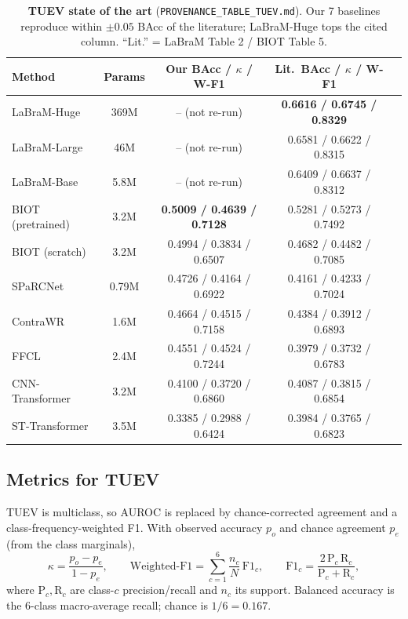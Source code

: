 \documentclass[10pt,a4paper]{article}
\newcommand{\best}[1]{\textbf{#1}}
\begin{document}
\begin{table}[h]\centering\small
\setlength{\tabcolsep}{6pt}\renewcommand{\arraystretch}{1.15}
\begin{tabular}{@{}lcccc@{}}
\toprule
\textbf{Method} & \textbf{Params} & \textbf{Our BAcc / $\kappa$ / W-F1} & \textbf{Lit.\ BAcc / $\kappa$ / W-F1} \\
\midrule
LaBraM-Huge \cite{labram}  & 369M & -- (not re-run) & \best{0.6616 / 0.6745 / 0.8329} \\
LaBraM-Large \cite{labram} & 46M  & -- (not re-run) & 0.6581 / 0.6622 / 0.8315 \\
LaBraM-Base \cite{labram}  & 5.8M & -- (not re-run) & 0.6409 / 0.6637 / 0.8312 \\
\midrule
BIOT (pretrained) \cite{biot}      & 3.2M & \best{0.5009 / 0.4639 / 0.7128} & 0.5281 / 0.5273 / 0.7492 \\
BIOT (scratch) \cite{biot}         & 3.2M & 0.4994 / 0.3834 / 0.6507 & 0.4682 / 0.4482 / 0.7085 \\
SPaRCNet \cite{sparcnet}           & 0.79M& 0.4726 / 0.4164 / 0.6922 & 0.4161 / 0.4233 / 0.7024 \\
ContraWR \cite{contrawr}           & 1.6M & 0.4664 / 0.4515 / 0.7158 & 0.4384 / 0.3912 / 0.6893 \\
FFCL \cite{ffcl}                   & 2.4M & 0.4551 / 0.4524 / 0.7244 & 0.3979 / 0.3732 / 0.6783 \\
CNN-Transformer \cite{cnntransformer}& 3.2M & 0.4100 / 0.3720 / 0.6860 & 0.4087 / 0.3815 / 0.6854 \\
ST-Transformer \cite{sttransformer}& 3.5M & 0.3385 / 0.2988 / 0.6424 & 0.3984 / 0.3765 / 0.6823 \\
\bottomrule
\end{tabular}
\caption{\textbf{TUEV state of the art} (\texttt{PROVENANCE\_TABLE\_TUEV.md}). Our 7 baselines reproduce
within $\pm0.05$ BAcc of the literature; LaBraM-Huge tops the cited column. ``Lit.'' = LaBraM Table 2 /
BIOT Table 5.}
\label{tab:tuev_sota}
\end{table}

\subsection{Metrics for TUEV}
TUEV is multiclass, so AUROC is replaced by chance-corrected agreement and a class-frequency-weighted F1.
With observed accuracy $p_o$ and chance agreement $p_e$ (from the class marginals),
\begin{equation}
\kappa = \frac{p_o - p_e}{1 - p_e},
\qquad
\text{Weighted-F1} = \sum_{c=1}^{6}\frac{n_c}{N}\,\mathrm{F1}_c,
\qquad
\mathrm{F1}_c = \frac{2\,\mathrm{P}_c\,\mathrm{R}_c}{\mathrm{P}_c+\mathrm{R}_c},
\end{equation}
where $\mathrm{P}_c,\mathrm{R}_c$ are class-$c$ precision/recall and $n_c$ its support. Balanced accuracy is
the 6-class macro-average recall; chance is $1/6=0.167$.
\end{document}
